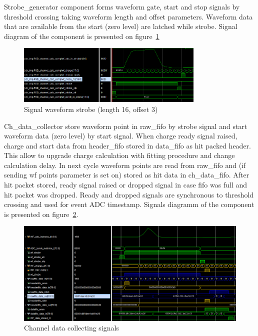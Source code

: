 \documentclass{article}
\begin{document}
Strobe\_generator component forms waveform gate, start and stop signals by threshold crossing taking waveform length and offset parameters. Waveform data that are available from the start (zero level) are latched while strobe. Signal diagram of the component is presented on figure~\ref{fig:3}

\begin{figure}[H]
	\centering 
	\includegraphics[width=0.8\textwidth]{wf_strobe_diag.png}
	\caption{\label{fig:3} Signal waveform strobe (length 16, offset 3)}
\end{figure}


Ch\_data\_collector store waveform point in raw\_fifo by strobe signal and start waveform data (zero level) by start signal. When charge ready signal raised, charge and start data from header\_fifo stored in data\_fifo as hit packed header. This allow to upgrade charge calculation with fitting procedure and change calculation delay. In next cycle waveform points are read from raw\_fifo and (if sending wf points parameter is set on) stored as hit data in ch\_data\_fifo. After hit packet stored, ready signal raised or dropped signal in case fifo was full and hit packet was dropped. Ready and dropped signals are synchronous to threshold crossing and used for event ADC timestamp.  Signals diagramm of the component is presented on figure~\ref{fig:4}.


\begin{figure}[H]
	\centering 
	\includegraphics[width=1.0\textwidth]{ADC_ch_data_collector_wave.png}
	\caption{\label{fig:4} Channel data collecting signals}
\end{figure}
\end{document}
